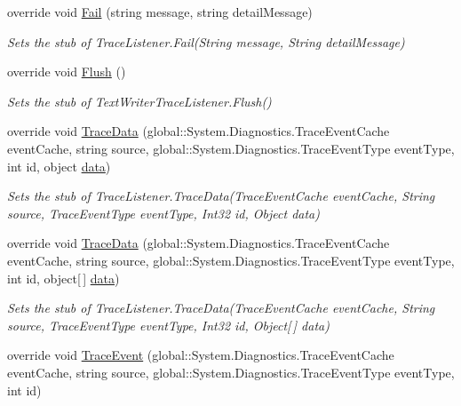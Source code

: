 \begin{DoxyCompactItemize}
override void \hyperlink{class_system_1_1_diagnostics_1_1_fakes_1_1_stub_console_trace_listener_a09e4b76571aaed03b4eb5b57906c66b6}{Fail} (string message, string detail\-Message)
\begin{DoxyCompactList}\small\item\em Sets the stub of Trace\-Listener.\-Fail(\-String message, String detail\-Message)\end{DoxyCompactList}\item 
override void \hyperlink{class_system_1_1_diagnostics_1_1_fakes_1_1_stub_console_trace_listener_ab609f123df9b7d384908b82a1417e5a4}{Flush} ()
\begin{DoxyCompactList}\small\item\em Sets the stub of Text\-Writer\-Trace\-Listener.\-Flush()\end{DoxyCompactList}\item 
override void \hyperlink{class_system_1_1_diagnostics_1_1_fakes_1_1_stub_console_trace_listener_a12f36b0b1d21c063861f1ab87bbefeba}{Trace\-Data} (global\-::\-System.\-Diagnostics.\-Trace\-Event\-Cache event\-Cache, string source, global\-::\-System.\-Diagnostics.\-Trace\-Event\-Type event\-Type, int id, object \hyperlink{jquery-1_810_82-vsdoc_8js_a609407b3456fdc3c5671a9fc4a226ff7}{data})
\begin{DoxyCompactList}\small\item\em Sets the stub of Trace\-Listener.\-Trace\-Data(\-Trace\-Event\-Cache event\-Cache, String source, Trace\-Event\-Type event\-Type, Int32 id, Object data)\end{DoxyCompactList}\item 
override void \hyperlink{class_system_1_1_diagnostics_1_1_fakes_1_1_stub_console_trace_listener_a1795282f08013dc11ff42ea3039e9ed6}{Trace\-Data} (global\-::\-System.\-Diagnostics.\-Trace\-Event\-Cache event\-Cache, string source, global\-::\-System.\-Diagnostics.\-Trace\-Event\-Type event\-Type, int id, object\mbox{[}$\,$\mbox{]} \hyperlink{jquery-1_810_82-vsdoc_8js_a609407b3456fdc3c5671a9fc4a226ff7}{data})
\begin{DoxyCompactList}\small\item\em Sets the stub of Trace\-Listener.\-Trace\-Data(\-Trace\-Event\-Cache event\-Cache, String source, Trace\-Event\-Type event\-Type, Int32 id, Object\mbox{[}$\,$\mbox{]} data)\end{DoxyCompactList}\item 
override void \hyperlink{class_system_1_1_diagnostics_1_1_fakes_1_1_stub_console_trace_listener_a148e58add38303ce410415415fc14699}{Trace\-Event} (global\-::\-System.\-Diagnostics.\-Trace\-Event\-Cache event\-Cache, string source, global\-::\-System.\-Diagnostics.\-Trace\-Event\-Type event\-Type, int id)

\end{DoxyCompactItemize}
